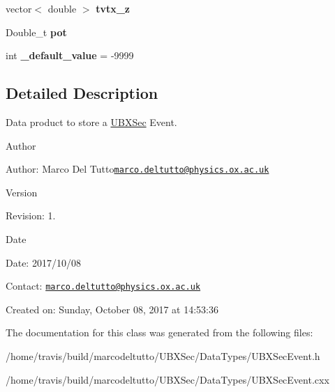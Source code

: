 \begin{DoxyCompactItemize}
\item 
\hypertarget{classUBXSecEvent_afcae666a9433c56792d47c53856d66ac}{vector$<$ double $>$ {\bfseries tvtx\-\_\-z}}\label{classUBXSecEvent_afcae666a9433c56792d47c53856d66ac}

\item 
\hypertarget{classUBXSecEvent_ad783d4eedd7be14db4d5b7b9cb2d144a}{Double\-\_\-t {\bfseries pot}}\label{classUBXSecEvent_ad783d4eedd7be14db4d5b7b9cb2d144a}

\item 
\hypertarget{classUBXSecEvent_a88e5ff2c7d0db95750e980740231d80b}{int {\bfseries \-\_\-default\-\_\-value} = -\/9999}\label{classUBXSecEvent_a88e5ff2c7d0db95750e980740231d80b}

\end{DoxyCompactItemize}


\subsection{Detailed Description}
Data product to store a \hyperlink{classUBXSec}{U\-B\-X\-Sec} Event. 

\begin{DoxyAuthor}{Author}

\end{DoxyAuthor}
\begin{DoxyParagraph}{Author\-:}
Marco Del Tutto\href{mailto:marco.deltutto@physics.ox.ac.uk}{\tt marco.\-deltutto@physics.\-ox.\-ac.\-uk} 
\end{DoxyParagraph}


\begin{DoxyVersion}{Version}

\end{DoxyVersion}
\begin{DoxyParagraph}{Revision\-:}
1. 
\end{DoxyParagraph}


\begin{DoxyDate}{Date}

\end{DoxyDate}
\begin{DoxyParagraph}{Date\-:}
2017/10/08 
\end{DoxyParagraph}


Contact\-: \href{mailto:marco.deltutto@physics.ox.ac.uk}{\tt marco.\-deltutto@physics.\-ox.\-ac.\-uk}

Created on\-: Sunday, October 08, 2017 at 14\-:53\-:36 

The documentation for this class was generated from the following files\-:\begin{DoxyCompactItemize}
\item 
/home/travis/build/marcodeltutto/\-U\-B\-X\-Sec/\-Data\-Types/U\-B\-X\-Sec\-Event.\-h\item 
/home/travis/build/marcodeltutto/\-U\-B\-X\-Sec/\-Data\-Types/U\-B\-X\-Sec\-Event.\-cxx\end{DoxyCompactItemize}

